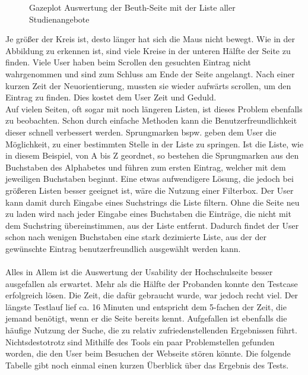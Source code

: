 \begin{center}
\end{center}
\begin{figure}[htb]
   \centering
   \caption{Gazeplot Auswertung der Beuth-Seite mit der Liste aller Studienangebote}
    \label{gazeplotCourses}
\end{figure}

Je größer der Kreis ist, desto länger hat sich die Maus nicht bewegt. Wie in der Abbildung zu erkennen ist, sind viele Kreise in der unteren Hälfte der Seite zu finden. Viele User haben beim Scrollen den gesuchten Eintrag nicht wahrgenommen und sind zum Schluss am Ende der Seite angelangt. Nach einer kurzen Zeit der Neuorientierung, mussten sie wieder aufwärts scrollen, um den Eintrag zu finden. Dies kostet dem User Zeit und Geduld.\\
Auf vielen Seiten, oft sogar mit noch längeren Listen, ist dieses Problem ebenfalls zu beobachten. Schon durch einfache Methoden kann die Benutzerfreundlichkeit dieser schnell verbessert werden. Sprungmarken bspw. geben dem User die Möglichkeit, zu einer bestimmten Stelle in der Liste zu \glqq springen\grqq{}. Ist die Liste, wie in diesem Beispiel, von A bis Z geordnet, so bestehen die Sprungmarken aus den Buchstaben des Alphabetes und führen zum ersten Eintrag, welcher mit dem jeweiligen Buchstaben beginnt. Eine etwas aufwendigere Lösung, die jedoch bei größeren Listen besser geeignet ist, wäre die Nutzung einer Filterbox. Der User kann damit durch Eingabe eines Suchstrings die Liste filtern. Ohne die Seite neu zu laden wird nach jeder Eingabe eines Buchstaben die Einträge, die nicht mit dem Suchstring übereinstimmen, aus der Liste entfernt. Dadurch findet der User schon nach wenigen Buchstaben eine stark dezimierte Liste, aus der der gewünschte Eintrag benutzerfreundlich ausgewählt werden kann.\\
\\
Alles in Allem ist die Auswertung der Usability der Hochschulseite besser ausgefallen als erwartet. Mehr als die Hälfte der Probanden konnte den Testcase erfolgreich lösen. Die Zeit, die dafür gebraucht wurde, war jedoch recht viel. Der längste Testlauf lief ca. 16 Minuten und entspricht dem 5-fachen der Zeit, die jemand benötigt, wenn er die Seite bereits kennt. Aufgefallen ist ebenfalls die häufige Nutzung der Suche, die zu relativ zufriedenstellenden Ergebnissen führt. Nichtsdestotrotz sind Mithilfe des Tools ein paar Problemstellen gefunden worden, die den User beim Besuchen der Webseite stören könnte. Die folgende Tabelle gibt noch einmal einen kurzen Überblick über das Ergebnis des Tests.\\
